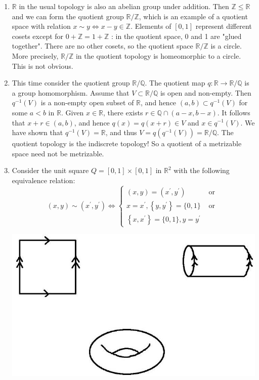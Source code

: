 \documentclass[a4paper]{article}
\begin{document}
\begin{example}
\begin{enumerate}
  \item $\mathbb{R}$ in the usual topology is also an abelian group under addition. Then $\mathbb{Z} \leqslant \mathbb{R}$ and we can form the quotient group $\mathbb{R} / \mathbb{Z}$, which is an example of a quotient space with relation $x \sim y \Longleftrightarrow x-y \in \mathbb{Z}$. Elements of $[0,1]$ represent different cosets except for $0+\mathbb{Z}=1+\mathbb{Z}$ : in the quotient space, 0 and 1 are "glued together". There are no other cosets, so the quotient space $\mathbb{R} / \mathbb{Z}$ is a circle. More precisely, $\mathbb{R} / \mathbb{Z}$ in the quotient topology is homeomorphic to a circle. This is not obvious.

  \item This time consider the quotient group $\mathbb{R} / \mathbb{Q}$. The quotient map $q: \mathbb{R} \rightarrow \mathbb{R} / \mathbb{Q}$ is a group homomorphism. Assume that $V \subset \mathbb{R} / \mathbb{Q}$ is open and non-empty. Then $q^{-1}(V)$ is a non-empty open subset of $\mathbb{R}$, and hence $(a, b) \subset q^{-1}(V)$ for some $a<b$ in $\mathbb{R}$. Given $x \in \mathbb{R}$, there exists $r \in \mathbb{Q} \cap(a-x, b-x)$. It follows that $x+r \in(a, b)$, and hence $q(x)=q(x+r) \in V$ and $x \in q^{-1}(V)$. We have shown that $q^{-1}(V)=\mathbb{R}$, and thus $V=q\left(q^{-1}(V)\right)=\mathbb{R} / \mathbb{Q}$. The quotient topology is the indiscrete topology! So a quotient of a metrizable space need not be metrizable.
\item Consider the unit square $Q=[0,1] \times[0,1]$ in $\mathbb{R}^{2}$ with the following equivalence relation:
$$
(x, y) \sim\left(x^{\prime}, y^{\prime}\right) \Longleftrightarrow \begin{cases}(x, y)=\left(x^{\prime}, y^{\prime}\right) & \text { or } \\ x=x^{\prime},\left\{y, y^{\prime}\right\}=\{0,1\} & \text { or } \\ \left\{x, x^{\prime}\right\}=\{0,1\}, y=y^{\prime} & \end{cases}
$$
\begin{center}
    \includegraphics[scale=0.4]{at4.jpg}

\end{center}
\end{enumerate}
\end{example}
\end{document}
